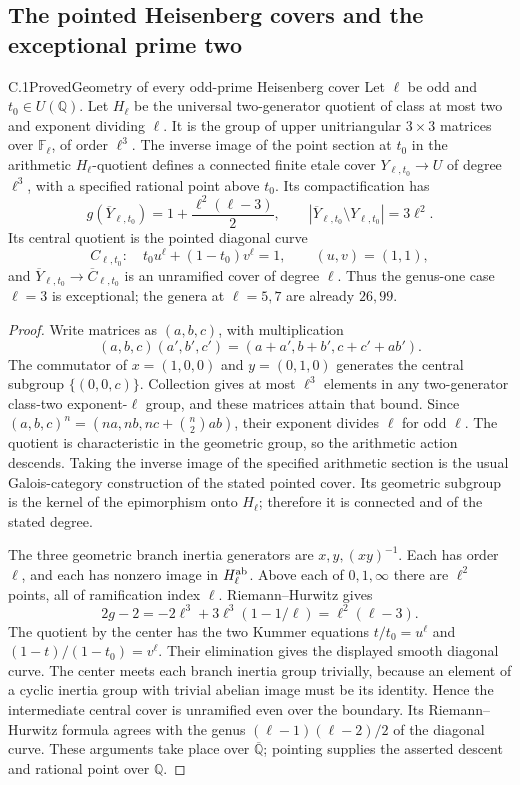 \subsection{The pointed Heisenberg covers and the exceptional prime two}

\begin{result}{C.1}{Proved}{Geometry of every odd-prime Heisenberg cover}
Let \(\ell\) be odd and \(t_0\in U(\mathbb Q)\).
Let \(H_\ell\) be the universal two-generator quotient of class at
most two and exponent dividing \(\ell\). It is the group of upper
unitriangular \(3\times3\) matrices over \(\mathbb F_\ell\), of
order \(\ell^3\). The inverse image of the point section at \(t_0\)
in the arithmetic \(H_\ell\)-quotient defines a connected finite
etale cover \(Y_{\ell,t_0}\to U\) of degree \(\ell^3\), with a
specified rational point above \(t_0\). Its compactification has
\[
 g(\overline Y_{\ell,t_0})=1+\frac{\ell^2(\ell-3)}2,
 \qquad |\overline Y_{\ell,t_0}\setminus Y_{\ell,t_0}|=3\ell^2.
\]
Its central quotient is the pointed diagonal curve
\[
 C_{\ell,t_0}:\quad t_0 u^\ell+(1-t_0)v^\ell=1,
 \qquad (u,v)=(1,1),
\]
and \(\overline Y_{\ell,t_0}\to\overline C_{\ell,t_0}\)
is an unramified cover of degree \(\ell\).
Thus the genus-one case \(\ell=3\) is exceptional; the genera at
\(\ell=5,7\) are already \(26,99\).
\end{result}
\begin{proof}
Write matrices as \((a,b,c)\), with multiplication
\[
 (a,b,c)(a',b',c')=(a+a',b+b',c+c'+ab').
\]
The commutator of \(x=(1,0,0)\) and \(y=(0,1,0)\) generates
the central subgroup \(\{(0,0,c)\}\). Collection gives at most
\(\ell^3\) elements in any two-generator class-two exponent-\(\ell\)
group, and these matrices attain that bound. Since
\((a,b,c)^n=(na,nb,nc+\binom n2ab)\), their exponent divides
\(\ell\) for odd \(\ell\). The quotient is characteristic in the
geometric group, so the arithmetic action descends. Taking the inverse
image of the specified arithmetic section is the usual Galois-category
construction of the stated pointed cover. Its geometric subgroup is the
kernel of the epimorphism onto \(H_\ell\); therefore it is connected
and of the stated degree.

The three geometric branch inertia generators are \(x,y,(xy)^{-1}\).
Each has order \(\ell\), and each has nonzero image in
\(H_\ell^{\rm ab}\). Above each of \(0,1,\infty\) there are
\(\ell^2\) points, all of ramification index \(\ell\).
Riemann--Hurwitz gives
\[
 2g-2=-2\ell^3+3\ell^3(1-1/\ell)=\ell^2(\ell-3).
\]
The quotient by the center has the two Kummer equations
\(t/t_0=u^\ell\) and \((1-t)/(1-t_0)=v^\ell\).
Their elimination gives the displayed smooth diagonal curve.
The center meets each branch inertia group trivially, because an
element of a cyclic inertia group with trivial abelian image must be
its identity. Hence the intermediate central cover is unramified even
over the boundary. Its Riemann--Hurwitz formula agrees with the
genus \((\ell-1)(\ell-2)/2\) of the diagonal curve.
These arguments take place over \(\overline{\mathbb Q}\); pointing
supplies the asserted descent and rational point over \(\mathbb Q\).
\end{proof}

